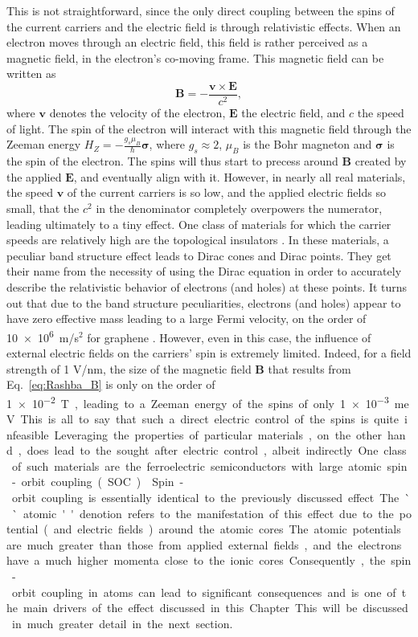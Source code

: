 This is not straightforward, since the only direct coupling between the spins of the current carriers and the electric field is through relativistic effects. When an electron moves through an electric field, this field is rather perceived as a magnetic field, in the electron's co-moving frame. This magnetic field can be written as
\begin{equation}
	\bm{B} = - \frac{\bm v \times \bm E}{c^2},
\end{equation}
where $\bm v$ denotes the velocity of the electron, $\bm E$ the electric field, and $c$ the speed of light.
The spin of the electron will interact with this magnetic field through the Zeeman energy $H_Z = -\frac{g_s\mu_B}{\hbar} \bm{\sigma}$, where $g_s \approx 2$, $\mu_B$ is the Bohr magneton and $\bm{\sigma}$ is the spin of the electron.
The spins will thus start to precess around $\bm B$ created by the applied $\bm E$, and eventually align with it.
However, in nearly all real materials, the speed $\bm v$ of the current carriers is so low, and the applied electric fields so small, that the $c^2$ in the denominator completely overpowers the numerator, leading ultimately to a tiny effect.
One class of materials for which the carrier speeds are relatively high are the topological insulators \cite{Kane2005a,Novoselov2005,CastroNeto2009,Fu2007,Fu2006,Pesin2012}.
In these materials, a peculiar band structure effect leads to Dirac cones and Dirac points. They get their name from the necessity of using the Dirac equation in order to accurately describe the relativistic behavior of electrons (and holes) at these points.
It turns out that due to the band structure peculiarities, electrons (and holes) appear to have zero effective mass leading to a large Fermi velocity, on the order of \SI{10e6}m/s$^2$ for graphene \cite{Novoselov2005}.   
However, even in this case, the influence of external electric fields on the carriers' spin is extremely limited.
Indeed, for a field strength of 1 V/nm, the size of the magnetic field $\bm B$ that results from Eq.~\ref{eq:Rashba_B} is only on the order of \SI{1e-2} T, leading to a Zeeman energy of the spins of only \SI{1e-3} meV.
This is all to say that such a direct electric control of the spins is quite infeasible.

Leveraging the properties of particular materials, on the other hand, does lead to the sought after electric control, albeit indirectly.
One class of such materials are the ferroelectric semiconductors with large atomic spin-orbit coupling (SOC) \cite{Picozzi2014,DiSante2013,Ishizaka2011,Kim2014}.
Spin-orbit coupling is essentially identical to the previously discussed effect.
The ``atomic'' denotion refers to the manifestation of this effect due to the potential (and electric fields) around the atomic cores.
The atomic potentials are much greater than those from applied external fields, and the electrons have a much higher momenta close to the ionic cores.
Consequently, the spin-orbit coupling in atoms can lead to significant consequences and is one of the main drivers of the effect discussed in this Chapter.
This will be discussed in much greater detail in the next section.

